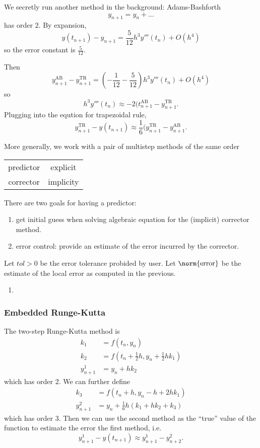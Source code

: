 \documentclass[a4paper]{article}
\begin{document}
We secretly run another method in the background:
Adams-Bashforth
\[
  y_{n + 1} = y_n + \dots
\]
has order \(2\). By expansion,
\[
  y(t_{n + 1}) - y_{n + 1} = \frac{5}{12}h^3y'''(t_n) + O(h^4)
\]
so the error constant is \(\frac{5}{12}\).

Then
\[
  y_{n + 1}^{\text{AB}} - y_{n + 1}^{\text{TR}} = (-\frac{1}{12} - \frac{5}{12})h^3y'''(t_n) + O(h^4)
\]
so
\[
  h^3y'''(t_n) \approx -2(t_{n + 1}^{\text{AB}} - y_{n + 1}^{\text{TR}}.
\]
Plugging into the eqution for trapezoidal rule,
\[
  y_{n + 1}^{\text{TR}} - y(t_{n + 1}) \approx \frac{1}{6} (y_{n + 1}^{\text{TR}} - y_{n + 1}^{\text{AB}}.
\]

More generally, we work with a pair of multistep methods of the same order
\begin{table}[ht]
  \centering
  \begin{tabular}{cc}
    predictor & explicit \\
    corrector & implicity
  \end{tabular}
\end{table}

There are two goals for having a predictor:
\begin{enumerate}
\item get initial guess when solving algebraic equation for the (implicit) corrector method.
\item error control: provide an estimate of the error incurred by the corrector.
\end{enumerate}

Let \(tol > 0\) be the error tolerance probided by user. Let \(\norm{\text{error}}\) be the estimate of the local error as computed in the previous.
\begin{enumerate}
\item \blindtext
\end{enumerate}

\subsubsection{Embedded Runge-Kutta}

The two-step Runge-Kutta method is
\begin{align*}
  k_1 &= f(t_n, y_n) \\
  k_2 &= f(t_n + \frac{1}{2}h, y_n + \frac{1}{2}hk_1) \\
  y_{n + 1}^1 &= y_n + hk_2
\end{align*}
which has order \(2\). We can further define
\begin{align*}
  k_3 &= f(t_n + h, y_n - h + 2hk_1) \\
  y_{n + 1}^2 &= y_n + \frac{1}{6}h(k_1 + hk_2 + k_3)
\end{align*}
which has order \(3\). Then we can use the second method as the ``true'' value of the function to estimate the error the first method, i.e.
\[
  y_{n + 1}^1 - y(t_{n + 1}) \approx y_{n + 1}^1 - y_{n + 2}^2.
\]
\end{document}

